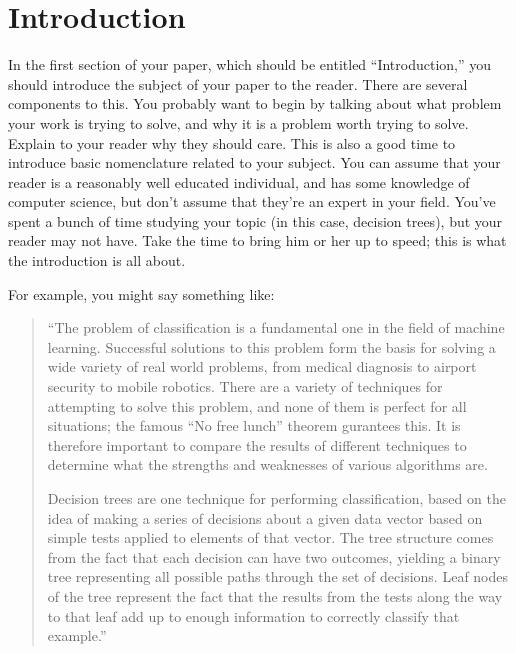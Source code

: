 \documentclass[12pt, letterpaper]{article}
\begin{document}
\section{Introduction}
In the first section of your paper, which should be entitled ``Introduction,''
you should introduce the subject of your paper to the reader.  There are several
components to this.  You probably want to begin by talking about what problem
your work is trying to solve, and why it is a problem worth trying to solve.
Explain to your reader why they should care.  This is also a good time to
introduce basic nomenclature related to your subject.  You can assume that your
reader is a reasonably well educated individual, and has some knowledge of
computer science, but don't assume that they're an expert in your field.  You've
spent a bunch of time studying your topic (in this case, decision trees), but
your reader may not have.  Take the time to bring him or her up to speed; this
is what the introduction is all about.

For example, you might say something like: 
\begin{quote}  %
``The problem of classification is a fundamental one in the field of machine
learning.  Successful solutions to this problem form the basis for solving a wide
variety of real world problems, from medical diagnosis to airport security to
mobile robotics.  There are a variety of techniques for attempting to solve this
problem, and none of them is perfect for all situations; the famous ``No free
lunch'' theorem\cite{noFreeLunch} gurantees this.  It is therefore important to
compare the results of different techniques to determine what the strengths and
weaknesses of various algorithms are. 

Decision trees are one technique for performing classification, based on the
idea of making a series of decisions about a given data vector based on simple
tests applied to elements of that vector.  The tree structure comes from the
fact that each decision can have two outcomes, yielding a binary tree
representing all possible paths through the set of decisions.  Leaf nodes of the
tree represent the fact that the results from the tests along the way to that
leaf add up to enough information to correctly classify that example.''
\end{quote}
\end{document}
